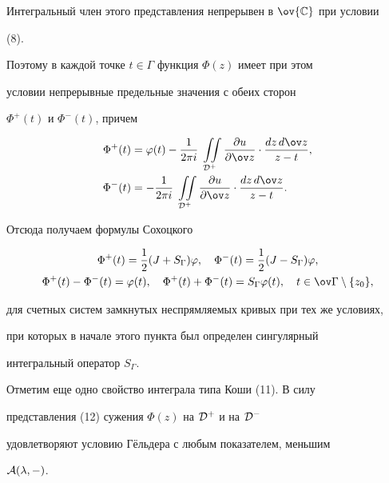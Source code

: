 Интегральный член этого представления непрерывен в $\ov{\Bbb C}$ при условии


(8).


Поэтому в каждой точке $t\in\Gamma$ функция $\Phi(z)$ имеет при этом


условии непрерывные предельные значения с обеих сторон


$\Phi^+(t)$ и $\Phi^-(t)$, причем


\begin{align*}


\Phi^+(t)&=\varphi(t)-\frac{1}{2\pi i}\;


\iint\limits_{\cal D^+}\frac{\partial u}{\partial\ov z}\cdot


\frac{dz\,d\ov z}{z-t}, \\


\Phi^-(t)&=-\frac{1}{2\pi i}\;\iint\limits_{\cal D^+}


\frac{\partial u}{\partial\ov z}\cdot


\frac{dz\,d\ov z}{z-t}.


\end{align*}


Отсюда получаем формулы Сохоцкого


\begin{gather*}


\Phi^+(t)=\frac{1}{2}(J+S_\Gamma)\varphi,\quad


\Phi^-(t)=\frac{1}{2}(J-S_\Gamma)\varphi, \\


\Phi^+(t)-\Phi^-(t)=\varphi(t),\quad


\Phi^+(t)+\Phi^-(t)=S_\Gamma\varphi(t),\quad


t\in\ov\Gamma\setminus\{z_0\},


\end{gather*}


для счетных систем замкнутых неспрямляемых кривых при тех же условиях,


при которых в начале этого пункта был определен сингулярный


интегральный оператор $S_\Gamma$.





Отметим еще одно свойство интеграла типа Коши (11). В силу


представления (12) сужения $\Phi(z)$ на $\cal D^+$ и на $\cal D^-$


удовлетворяют условию Г\"ельдера с любым показателем, меньшим


$\cal A(\lambda,\Gamma)$.


